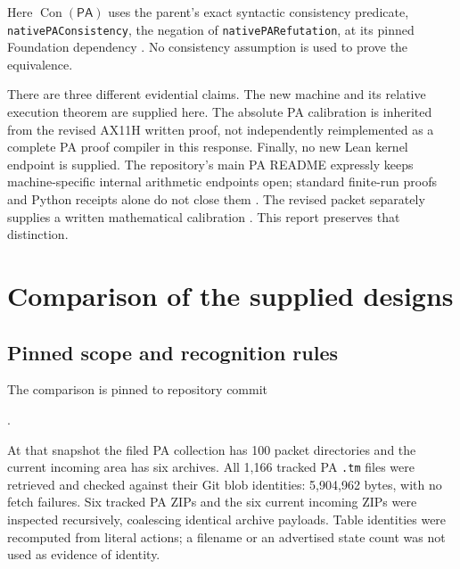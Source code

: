 \documentclass[10pt,a4paper]{article}
\newcommand{\PA}{\ensuremath{\mathsf{PA}}}
\newcommand{\Con}{\operatorname{Con}}
\theoremstyle{definition}
\begin{document}
Here $\Con(\PA)$ uses the parent's exact syntactic consistency predicate,
\texttt{nativePAConsistency}, the negation of
\texttt{nativePARefutation}, at its pinned Foundation dependency
.
No consistency assumption is used to prove the equivalence.

There are three different evidential claims. The new machine and its
relative execution theorem are supplied here. The absolute PA calibration
is inherited from the revised AX11H written proof, not independently
reimplemented as a complete PA proof compiler in this response. Finally,
no new Lean kernel endpoint is supplied. The repository's main PA README
expressly keeps machine-specific internal arithmetic endpoints open;
standard finite-run proofs and Python receipts alone do not close them
\cite{pa}. The revised packet separately supplies a written mathematical
calibration \cite{ax11h}. This report preserves that distinction.

\section{Comparison of the supplied designs}
\label{sec:comparison}

\subsection{Pinned scope and recognition rules}

The comparison is pinned to repository commit
\begin{center}.
\end{center}
At that snapshot the filed PA collection has 100 packet directories and
the current incoming area has six archives. All 1,166 tracked PA
\texttt{.tm} files were retrieved and checked against their Git blob
identities: 5,904,962 bytes, with no fetch failures. Six tracked PA ZIPs
and the six current incoming ZIPs were inspected recursively, coalescing
identical archive payloads. Table identities were recomputed from literal
actions; a filename or an advertised state count was not used as evidence
of identity.
\end{document}
